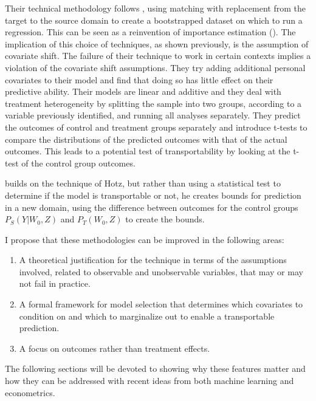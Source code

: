 \documentclass[a4paper,12pt]{article}
\begin{document}
Their technical methodology follows \cite{Abadie2006}, using matching with replacement from the target to the source domain to create a bootstrapped dataset on which to run a regression. This can be seen as a reinvention of importance estimation (\cite{Shimodaira2000, Suigyama2007}). The implication of this choice of techniques, as shown previously, is the assumption of covariate shift. The failure of their technique to work in certain contexts implies a violation of the covariate shift assumptions. They try adding additional personal covariates to their model and find that doing so has little effect on their predictive ability. Their models are linear and additive and they deal with treatment heterogeneity by splitting the sample into two groups, according to a variable previously identified, and running all analyses separately. They predict the outcomes of control and treatment groups separately and introduce t-tests to compare the distributions of the predicted outcomes with that of the actual outcomes. This leads to a potential test of transportability by looking at the t-test of the control group outcomes. 

\cite{Gechter2015} builds on the technique of Hotz, but rather than using a statistical test to determine if the model is transportable or not, he creates bounds for prediction in a new domain, using the difference between outcomes for the control groups $P_S(Y|W_0, Z)$ and  $P_T(W_0, Z)$ to create the bounds. 

I propose that these methodologies can be improved in the following areas:

\begin{enumerate}
\item A theoretical justification for the technique in terms of the assumptions involved, related to observable and unobservable variables, that may or may not fail in practice. 
\item A formal framework for model selection that determines which covariates to condition on and which to marginalize out to enable a transportable prediction.
\item A focus on outcomes rather than treatment effects.
\end{enumerate}

The following sections will be devoted to showing why these features matter and how they can be addressed with recent ideas from both machine learning and econometrics. 

\end{document}
